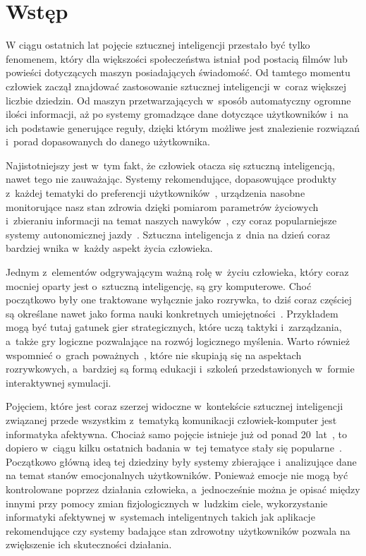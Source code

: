 \chapter{Wstęp}
\label{cha:wstep}
W ciągu ostatnich lat pojęcie sztucznej inteligencji przestało być tylko fenomenem, który dla większości społeczeństwa istniał pod postacią filmów lub powieści dotyczących maszyn posiadających świadomość. Od tamtego momentu człowiek zaczął znajdować zastosowanie sztucznej inteligencji w~coraz większej liczbie dziedzin. Od maszyn przetwarzających w~sposób automatyczny ogromne ilości informacji, aż po systemy gromadzące dane dotyczące użytkowników i~na ich podstawie generujące reguły, dzięki którym możliwe jest znalezienie rozwiązań i~porad dopasowanych do danego użytkownika.

Najistotniejszy jest w~tym fakt, że człowiek otacza się sztuczną inteligencją, nawet tego nie zauważając. Systemy rekomendujące, dopasowujące produkty z~każdej tematyki do preferencji użytkowników~\cite{Gomez-Uribe:2015:NRS:2869770.2843948}, urządzenia nasobne monitorujące nasz stan zdrowia dzięki pomiarom parametrów życiowych i~zbieraniu informacji na temat naszych nawyków~\cite{wearable_computing_amft}, czy coraz popularniejsze systemy autonomicznej jazdy~\cite{dikmen_tesla_autopilot}. Sztuczna inteligencja z~dnia na dzień coraz bardziej wnika w~każdy aspekt życia człowieka. 

Jednym z~elementów odgrywającym ważną rolę w~życiu człowieka, który coraz mocniej oparty jest o~sztuczną inteligencję, są gry komputerowe.  Choć początkowo były one traktowane wyłącznie jako rozrywka, to dziś coraz częściej są określane nawet jako forma nauki konkretnych umiejętności~\cite{oberdorfer_develop_your_strengths_by_gaming}. Przykładem mogą być tutaj gatunek gier strategicznych, które uczą taktyki i~zarządzania, a~także gry logiczne pozwalające na rozwój logicznego myślenia. Warto również wspomnieć o~grach poważnych~\cite{serious_games_michael_chen}, które nie skupiają się na aspektach rozrywkowych, a~bardziej są formą edukacji i~szkoleń przedstawionych w~formie interaktywnej symulacji.

Pojęciem, które jest coraz szerzej widoczne w~kontekście sztucznej inteligencji związanej przede wszystkim z~tematyką komunikacji człowiek-komputer jest informatyka afektywna. Chociaż samo pojęcie istnieje już od ponad 20~lat~\cite{Picard:1997:AC:265013}, to dopiero w~ciągu kilku ostatnich badania w~tej tematyce stały się popularne~\cite{gartner_hype_cycles_2018}. Początkowo główną ideą tej dziedziny były systemy zbierające i~analizujące dane na temat stanów emocjonalnych użytkowników. Ponieważ emocje nie mogą być kontrolowane poprzez działania człowieka, a~jednocześnie można je opisać między innymi przy pomocy zmian fizjologicznych w~ludzkim ciele, wykorzystanie informatyki afektywnej w~systemach inteligentnych takich jak aplikacje rekomendujące czy systemy badające stan zdrowotny użytkowników pozwala na zwiększenie ich skuteczności działania.

